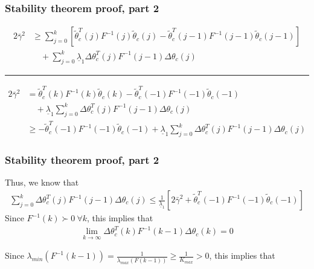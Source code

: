 \begin{frame}
    \frametitle{Stability theorem proof, part 2}

    \vspace*{-\baselineskip}
    \begin{align*}
        2 \bar{\gamma}^2 & \geq \sum_{j=0}^k \left[ \tilde{\theta}_c^T(j) F^{-1}(j) \tilde{\theta}_c(j)
            - \tilde{\theta}_c^T(j-1) F^{-1}(j-1) \tilde{\theta}_c(j-1) \right] \\
        & \quad + \sum_{j=0}^k \underline{\lambda}_1 \Delta \theta_c^T(j) F^{-1}(j-1) \Delta \theta_c(j)
    \end{align*}
    \hrule{\hfill}
    
    \vspace*{-\baselineskip}
    \begin{align*}
        2 \bar{\gamma}^2 & = \tilde{\theta}_c^T(k) F^{-1}(k) \tilde{\theta}_c(k)
            - \tilde{\theta}_c^T(-1) F^{-1}(-1) \tilde{\theta}_c(-1) \\
        & \quad + \underline{\lambda}_1 \sum_{j=0}^k \Delta \theta_c^T(j) F^{-1}(j-1) \Delta \theta_c(j) \\
        & \geq - \tilde{\theta}_c^T(-1) F^{-1}(-1) \tilde{\theta}_c(-1)
            + \underline{\lambda}_1 \sum_{j=0}^k \Delta \theta_c^T(j) F^{-1}(j-1) \Delta \theta_c(j)
    \end{align*}
\end{frame}

\begin{frame}
    \frametitle{Stability theorem proof, part 2}

    Thus, we know that
    \begin{align*}
        \sum_{j=0}^k \Delta \theta_c^T(j) F^{-1}(j-1) \Delta \theta_c(j) \leq
            \frac{1}{ \underline{\lambda}_1 } 
            \left[ 2 \bar{\gamma}^2 + \tilde{\theta}_c^T(-1) F^{-1}(-1) \tilde{\theta}_c(-1) \right]
    \end{align*}
    \pause
    Since $F^{-1}(k) \succ 0 \ \forall k$, this implies that
    \begin{align*}
        \lim_{k \rightarrow \infty} \Delta \theta_c^T(k) F^{-1}(k-1) \Delta \theta_c(k) = 0
    \end{align*}
    \pause

    Since $\displaystyle \lambda_{min} (F^{-1}(k-1)) = \frac{1}{ \lambda_{max} (F(k-1)) } \geq \frac{1}{K_{max}} > 0$, this implies that
\end{frame}

